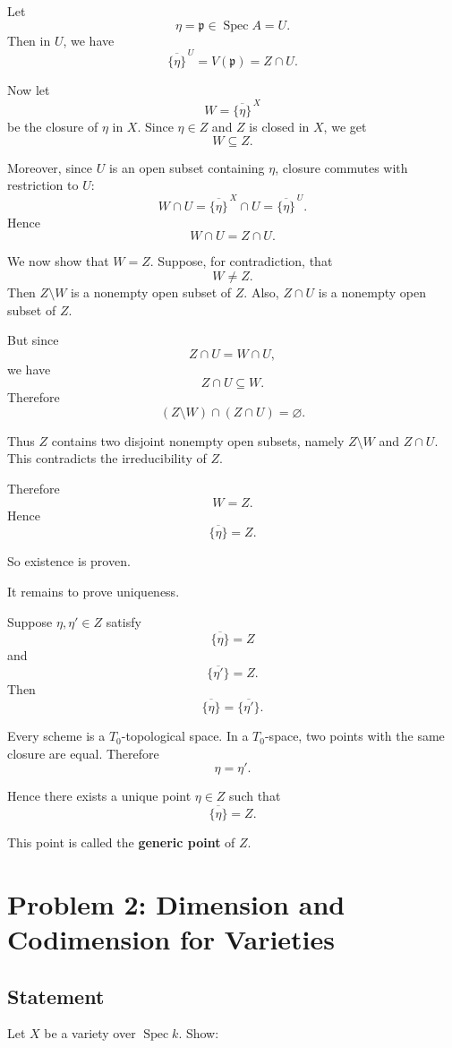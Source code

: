 \documentclass[12pt,a4paper]{article}
\DeclareMathOperator{\Spec}{Spec}
\providecommand{\Spec}{\operatorname{Spec}}
\theoremstyle{notespace}
\begin{document}
Let
\[
\eta=\mathfrak p\in \Spec A=U.
\]
Then in \(U\), we have
\[
\overline{\{\eta\}}^{\,U}=V(\mathfrak p)=Z\cap U.
\]

Now let
\[
W=\overline{\{\eta\}}^{\,X}
\]
be the closure of \(\eta\) in \(X\). Since \(\eta\in Z\) and \(Z\) is closed in \(X\), we get
\[
W\subseteq Z.
\]

Moreover, since \(U\) is an open subset containing \(\eta\), closure commutes with restriction to \(U\):
\[
W\cap U
=
\overline{\{\eta\}}^{\,X}\cap U
=
\overline{\{\eta\}}^{\,U}.
\]
Hence
\[
W\cap U=Z\cap U.
\]

We now show that \(W=Z\). Suppose, for contradiction, that
\[
W\neq Z.
\]
Then \(Z\setminus W\) is a nonempty open subset of \(Z\). Also, \(Z\cap U\) is a nonempty open subset of \(Z\).

But since
\[
Z\cap U=W\cap U,
\]
we have
\[
Z\cap U\subseteq W.
\]
Therefore
\[
(Z\setminus W)\cap (Z\cap U)=\varnothing.
\]

Thus \(Z\) contains two disjoint nonempty open subsets, namely \(Z\setminus W\) and \(Z\cap U\). This contradicts the irreducibility of \(Z\).

Therefore
\[
W=Z.
\]
Hence
\[
\overline{\{\eta\}}=Z.
\]

So existence is proven.

It remains to prove uniqueness.

Suppose \(\eta,\eta'\in Z\) satisfy
\[
\overline{\{\eta\}}=Z
\]
and
\[
\overline{\{\eta'\}}=Z.
\]
Then
\[
\overline{\{\eta\}}=\overline{\{\eta'\}}.
\]

Every scheme is a \(T_0\)-topological space. In a \(T_0\)-space, two points with the same closure are equal. Therefore
\[
\eta=\eta'.
\]

Hence there exists a unique point \(\eta\in Z\) such that
\[
\boxed{\overline{\{\eta\}}=Z.}
\]

This point is called the \textbf{generic point} of \(Z\).

\newpage

\section{Problem 2: Dimension and Codimension for Varieties}

\subsection*{Statement}

Let \(X\) be a variety over \(\Spec k\). Show:
\end{document}
